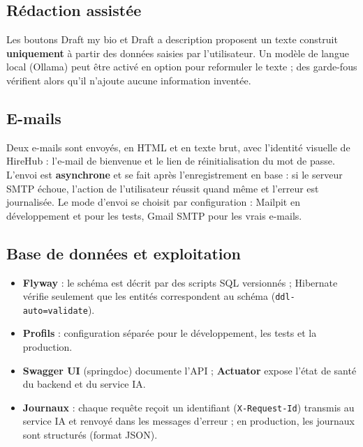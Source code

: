 \documentclass[12pt,a4paper]{report}
\begin{document}
\subsection{Rédaction assistée}
Les boutons \og Draft my bio\fg{} et \og Draft a description\fg{} proposent un texte construit \textbf{uniquement} à partir des données saisies par l'utilisateur. Un modèle de langue local (Ollama) peut être activé en option pour reformuler le texte ; des garde-fous vérifient alors qu'il n'ajoute aucune information inventée.

\subsection{E-mails}
Deux e-mails sont envoyés, en HTML et en texte brut, avec l'identité visuelle de HireHub : l'e-mail de bienvenue et le lien de réinitialisation du mot de passe. L'envoi est \textbf{asynchrone} et se fait après l'enregistrement en base : si le serveur SMTP échoue, l'action de l'utilisateur réussit quand même et l'erreur est journalisée. Le mode d'envoi se choisit par configuration : Mailpit en développement et pour les tests, Gmail SMTP pour les vrais e-mails.

\subsection{Base de données et exploitation}
\begin{itemize}
  \item \textbf{Flyway} : le schéma est décrit par des scripts SQL versionnés ; Hibernate vérifie seulement que les entités correspondent au schéma (\texttt{ddl-auto=validate}).
  \item \textbf{Profils} : configuration séparée pour le développement, les tests et la production.
  \item \textbf{Swagger UI} (springdoc) documente l'API ; \textbf{Actuator} expose l'état de santé du backend et du service IA.
  \item \textbf{Journaux} : chaque requête reçoit un identifiant (\texttt{X-Request-Id}) transmis au service IA et renvoyé dans les messages d'erreur ; en production, les journaux sont structurés (format JSON).
\end{itemize}
\end{document}
